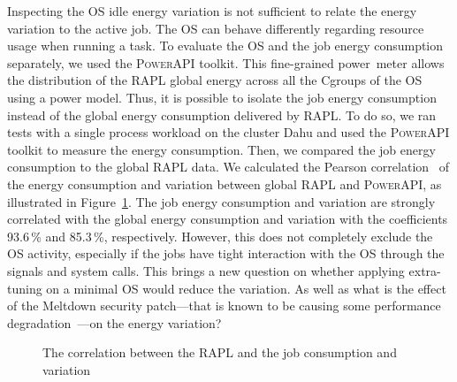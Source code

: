Inspecting the OS idle energy variation is not sufficient to relate the energy variation to the active job.
The OS can behave differently regarding resource usage when running a task.
To evaluate the OS and the job energy consumption separately, we used the \textsc{PowerAPI} toolkit.
This fine-grained power~meter allows the distribution of the RAPL global energy across all the Cgroups of the OS using a power model.
Thus, it is possible to isolate the job energy consumption instead of the global energy consumption delivered by RAPL.
To do so, we ran tests with a single process workload on the cluster \textsf{Dahu} and used the \textsc{PowerAPI} toolkit to measure the energy consumption.
Then, we compared the job energy consumption to the global RAPL data.
We calculated the Pearson correlation~\cite{ref1} of the energy consumption and variation between global RAPL and \textsc{PowerAPI}, as illustrated in Figure~\ref{fig:ev_correlation}.
The job energy consumption and variation are strongly correlated with the global energy consumption and variation with the coefficients 93.6\,\% and 85.3\,\%, respectively.
However, this does not completely exclude the OS activity, especially if the jobs have tight interaction with the OS through the signals and system calls.
This brings a new question on whether applying extra-tuning on a minimal OS would reduce the variation.
As well as what is the effect of the Meltdown security patch---that is known to be causing some performance degradation~\cite{Kocher2018spectre,Lipp2018meltdown}---on the energy variation?

\begin{figure}
    \caption{The correlation between the RAPL and the job consumption and variation}\label{fig:ev_correlation}
\end{figure}

